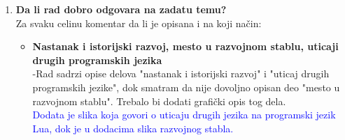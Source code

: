 \documentclass[a4paper]{report}
\newcommand{\odgovorAutora}[1]{\textcolor{blue}{#1}}
\begin{document}
\begin{enumerate}
\item \textbf {Da li rad dobro odgovara na zadatu temu?}\\
  Za svaku celinu komentar da li je opisana i na koji na\v cin:
\begin{itemize}
   

    \item \textbf {Nastanak i istorijski razvoj, mesto u razvojnom stablu, uticaji drugih programskih jezika} \\
      -Rad sadrzi opise delova "nastanak i istorijski razvoj" i "uticaj drugih programskih jezike", dok smatram da nije dovoljno opisan deo "mesto u razvojnom stablu". Trebalo bi dodati grafi\v cki opis tog dela. \\
\odgovorAutora{Dodata je slika koja govori o uticaju drugih jezika na programski jezik Lua, dok je u dodacima slika razvojnog stabla.}


\end{itemize}
\end{enumerate}
\end{document}
